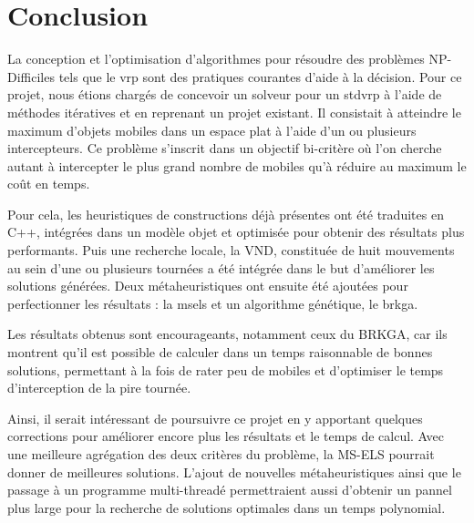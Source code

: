 \chapter*{Conclusion}

La conception et l'optimisation d'algorithmes pour résoudre des problèmes NP-Difficiles tels que le \acrlong{vrp} sont des pratiques courantes d'aide à la décision. Pour ce projet, nous étions chargés de concevoir un solveur pour un \acrlong{stdvrp} à l'aide de méthodes itératives et en reprenant un projet existant. Il consistait à atteindre le maximum d'objets mobiles dans un espace plat à l'aide d'un ou plusieurs intercepteurs. Ce problème s'inscrit dans un objectif bi-critère où l'on cherche autant à intercepter le plus grand nombre de mobiles qu'à réduire au maximum le coût en temps.

Pour cela, les heuristiques de constructions déjà présentes ont été traduites en C++, intégrées dans un modèle objet et optimisée pour obtenir des résultats plus performants. Puis une recherche locale, la VND, constituée de huit mouvements au sein d'une ou plusieurs tournées a été intégrée dans le but d'améliorer les solutions générées. Deux métaheuristiques ont ensuite été ajoutées pour perfectionner les résultats : la \acrlong{msels} et un algorithme génétique, le \acrlong{brkga}.

Les résultats obtenus sont encourageants, notamment ceux du BRKGA, car ils montrent qu'il est possible de calculer dans un temps raisonnable de bonnes solutions, permettant à la fois de rater peu de mobiles et d'optimiser le temps d'interception de la pire tournée.

Ainsi, il serait intéressant de poursuivre ce projet en y apportant quelques corrections pour améliorer encore plus les résultats et le temps de calcul. Avec une meilleure agrégation des deux critères du problème, la MS-ELS pourrait donner de meilleures solutions. L'ajout de nouvelles métaheuristiques ainsi que le passage à un programme multi-threadé permettraient aussi d'obtenir un pannel plus large pour la recherche de solutions optimales dans un temps polynomial.
